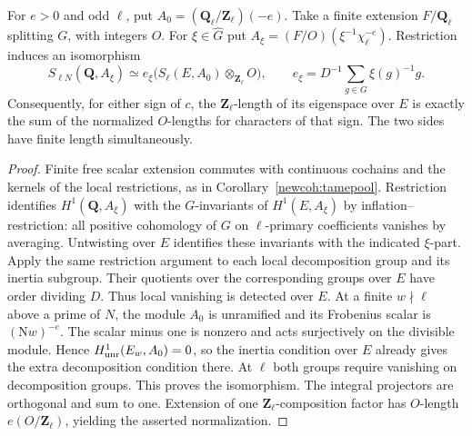 \begin{proposition}\label{zetafield:descent}
For \(e>0\) and odd \(\ell\), put \(A_0=(\mathbf Q_\ell/\mathbf
Z_\ell)(-e)\). Take a finite extension \(F/\mathbf Q_\ell\) splitting
\(G\), with integers \(O\). For \(\xi\in\widehat G\) put
\(A_\xi=(F/O)(\xi^{-1}\chi_\ell^{-e})\). Restriction induces an isomorphism
\[
 S_{\ell N}(\mathbf Q,A_\xi)
 \simeq e_\xi\bigl(S_\ell(E,A_0)\otimes_{\mathbf Z_\ell}O\bigr),
 \qquad e_\xi=D^{-1}\sum_{g\in G}\xi(g)^{-1}g .
\]
Consequently, for either sign of \(c\), the \(\mathbf Z_\ell\)-length
of its eigenspace over \(E\) is exactly the sum of the normalized
\(O\)-lengths for characters of that sign. The two sides have finite
length simultaneously.
\end{proposition}
\begin{proof}
Finite free scalar extension commutes with continuous cochains and
the kernels of the local restrictions, as in Corollary~\ref{newcoh:tamepool}.
Restriction identifies \(H^1(\mathbf Q,A_\xi)\) with the
\(G\)-invariants of \(H^1(E,A_\xi)\) by inflation--restriction:
all positive cohomology of \(G\) on \(\ell\)-primary coefficients
vanishes by averaging. Untwisting over \(E\) identifies these invariants
with the indicated \(\xi\)-part. Apply the same restriction argument
to each local decomposition group and its inertia subgroup. Their
quotients over the corresponding groups over \(E\) have order dividing \(D\).
Thus local vanishing is detected over \(E\). At a finite \(w\nmid\ell\)
above a prime of \(N\), the module \(A_0\) is unramified and its
Frobenius scalar is \((\mathrm Nw)^{-e}\). The scalar minus one is
nonzero and acts surjectively on the divisible module. Hence
\(H^1_{\rm unr}(E_w,A_0)=0\), so the inertia condition over \(E\)
already gives the extra decomposition condition there. At \(\ell\)
both groups require vanishing on decomposition groups. This proves
the isomorphism. The integral projectors are orthogonal and sum to
one. Extension of one \(\mathbf Z_\ell\)-composition factor has
\(O\)-length \(e(O/\mathbf Z_\ell)\), yielding the asserted normalization.
\end{proof}

